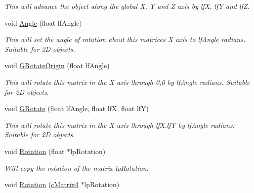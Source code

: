 \begin{DoxyCompactItemize}
\begin{DoxyCompactList}\small\item\em This will advance the object along the global X, Y and Z axis by lfX, lfY and lfZ. \end{DoxyCompactList}\item 
\hypertarget{classc_matrix4_ac86eb165802e359a11ace5db20b73c72}{
void \hyperlink{classc_matrix4_ac86eb165802e359a11ace5db20b73c72}{Angle} (float lfAngle)}
\label{classc_matrix4_ac86eb165802e359a11ace5db20b73c72}

\begin{DoxyCompactList}\small\item\em This will set the angle of rotation about this matrices X axis to lfAngle radians. Suitable for 2D objects. \end{DoxyCompactList}\item 
\hypertarget{classc_matrix4_a04a196147274eb6b3d1aca1782c26091}{
void \hyperlink{classc_matrix4_a04a196147274eb6b3d1aca1782c26091}{GRotateOrigin} (float lfAngle)}
\label{classc_matrix4_a04a196147274eb6b3d1aca1782c26091}

\begin{DoxyCompactList}\small\item\em This will rotate this matrix in the X axis through 0,0 by lfAngle radians. Suitable for 2D objects. \end{DoxyCompactList}\item 
\hypertarget{classc_matrix4_a5115db44a0c51d97be3d5791fb19d18a}{
void \hyperlink{classc_matrix4_a5115db44a0c51d97be3d5791fb19d18a}{GRotate} (float lfAngle, float lfX, float lfY)}
\label{classc_matrix4_a5115db44a0c51d97be3d5791fb19d18a}

\begin{DoxyCompactList}\small\item\em This will rotate this matrix in the X axis through lfX,lfY by lfAngle radians. Suitable for 2D objects. \end{DoxyCompactList}\item 
\hypertarget{classc_matrix4_aeca3db3711d09781ec4ecf78a0423574}{
void \hyperlink{classc_matrix4_aeca3db3711d09781ec4ecf78a0423574}{Rotation} (float $\ast$lpRotation)}
\label{classc_matrix4_aeca3db3711d09781ec4ecf78a0423574}

\begin{DoxyCompactList}\small\item\em Will copy the rotation of the matrix lpRotation. \end{DoxyCompactList}\item 
\hypertarget{classc_matrix4_a2777b2361f3656d4f8c1413456ea22d2}{
void \hyperlink{classc_matrix4_a2777b2361f3656d4f8c1413456ea22d2}{Rotation} (\hyperlink{classc_matrix4}{cMatrix4} $\ast$lpRotation)}
\label{classc_matrix4_a2777b2361f3656d4f8c1413456ea22d2}


\end{DoxyCompactItemize}
